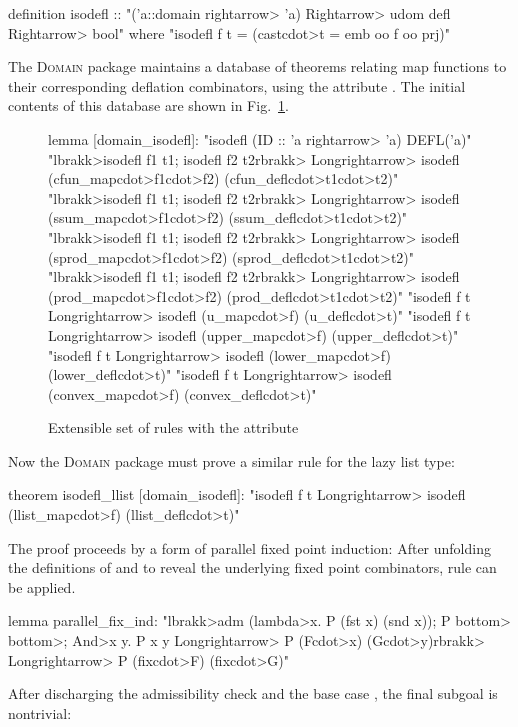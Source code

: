 \begin{isacode}
definition isodefl :: "('a::domain \<rightarrow> 'a) \<Rightarrow> udom defl \<Rightarrow> bool"
  where "isodefl f t = (cast\<cdot>t = emb oo f oo prj)"
\end{isacode}

The \textsc{Domain} package maintains a database of theorems relating map functions to their corresponding deflation combinators, using the attribute . The initial contents of this database are shown in Fig.~\ref{fig:universal-domain-isodefl}.

\begin{figure}
\begin{isacode}
lemma [domain_isodefl]:
  "isodefl (ID :: 'a \<rightarrow> 'a) DEFL('a)"
  "\<lbrakk>isodefl f1 t1; isodefl f2 t2\<rbrakk> \<Longrightarrow> isodefl (cfun_map\<cdot>f1\<cdot>f2) (cfun_defl\<cdot>t1\<cdot>t2)"
  "\<lbrakk>isodefl f1 t1; isodefl f2 t2\<rbrakk> \<Longrightarrow> isodefl (ssum_map\<cdot>f1\<cdot>f2) (ssum_defl\<cdot>t1\<cdot>t2)"
  "\<lbrakk>isodefl f1 t1; isodefl f2 t2\<rbrakk> \<Longrightarrow> isodefl (sprod_map\<cdot>f1\<cdot>f2) (sprod_defl\<cdot>t1\<cdot>t2)"
  "\<lbrakk>isodefl f1 t1; isodefl f2 t2\<rbrakk> \<Longrightarrow> isodefl (prod_map\<cdot>f1\<cdot>f2) (prod_defl\<cdot>t1\<cdot>t2)"
  "isodefl f t \<Longrightarrow> isodefl (u_map\<cdot>f) (u_defl\<cdot>t)"
  "isodefl f t \<Longrightarrow> isodefl (upper_map\<cdot>f) (upper_defl\<cdot>t)"
  "isodefl f t \<Longrightarrow> isodefl (lower_map\<cdot>f) (lower_defl\<cdot>t)"
  "isodefl f t \<Longrightarrow> isodefl (convex_map\<cdot>f) (convex_defl\<cdot>t)"
\end{isacode}
\caption{Extensible set of rules with the  attribute}
\label{fig:universal-domain-isodefl}
\end{figure}

Now the \textsc{Domain} package must prove a similar  rule for the lazy list type:
%
\begin{isacode}
theorem isodefl_llist [domain_isodefl]:
  "isodefl f t \<Longrightarrow> isodefl (llist_map\<cdot>f) (llist_defl\<cdot>t)"
\end{isacode}
%
The proof proceeds by a form of parallel fixed point induction: After unfolding the definitions of  and  to reveal the underlying fixed point combinators, rule  can be applied.
%
\begin{isacode}
lemma parallel_fix_ind:
  "\<lbrakk>adm (\<lambda>x. P (fst x) (snd x)); P \<bottom> \<bottom>; \<And>x y. P x y \<Longrightarrow> P (F\<cdot>x) (G\<cdot>y)\<rbrakk>
    \<Longrightarrow> P (fix\<cdot>F) (fix\<cdot>G)"
\end{isacode}
%
After discharging the admissibility check and the base case , the final subgoal is nontrivial:

